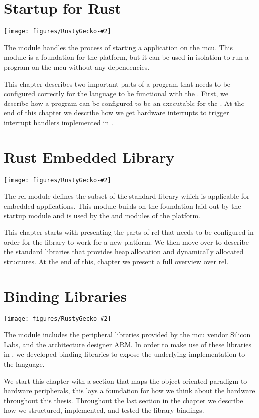 
\newcommand{\corechapter}[3]{
  \chapter{#1}
  \label{chap:#2}
  \begin{center}
    \texttt{[image: figures/RustyGecko-\#2]}
  \end{center}
  \hfill \break
  \hfill \break
#3
}

\corechapter{Startup for Rust}{startup}{%
The  module handles the process of starting a {\rust} application on the \glsdesc{mcu}.
This module is a foundation for the {\rg} platform, but it can be used in isolation to run a program on the \gls{mcu} without any dependencies.

This chapter describes two important parts of a {\rust} program that needs to be configured correctly for the language to be functional with the {\gecko}.
First, we describe how a {\rust} program can be configured to be an executable for the {\gecko}.
At the end of this chapter we describe how we get hardware interrupts to trigger interrupt handlers implemented in {\rust}.
}


\corechapter{Rust Embedded Library}{rel}{%
The \glsdesc{rel} module defines the subset of the standard {\rust} library which is applicable for embedded applications.
This module builds on the foundation laid out by the startup module and is used by the \lib{bindings} and \lib{Application Layer} modules of the {\rg} platform.

This chapter starts with presenting the parts of \gls{rcl} that needs to be configured in order for the library to work for a new platform.
We then move over to describe the standard {\rust} libraries that provides heap allocation and dynamically allocated structures.
At the end of this, chapter we present a full overview over \gls{rel}.
}



\corechapter{Binding Libraries}{bindings}{%
The  module includes the peripheral libraries provided by the \gls{mcu} vendor Silicon Labs, and the architecture designer ARM.
In order to make use of these libraries in {\rust}, we developed binding libraries to expose the underlying {\C} implementation to the {\rust} language.

We start this chapter with a section that maps the object-oriented paradigm to hardware peripherals, this lays a foundation for how we think about the hardware throughout this thesis.
Throughout the last section in the chapter we describe how we structured, implemented, and tested the library bindings.
}




